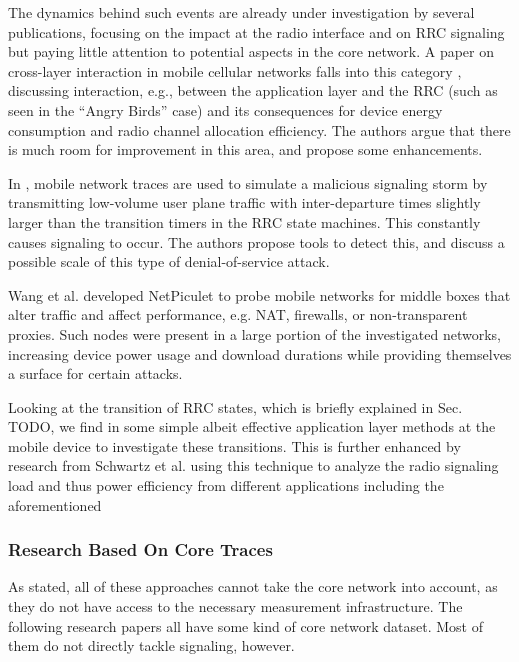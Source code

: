 The dynamics behind such events are already under investigation by several publications, focusing on the impact at the radio interface and on \ac{RRC} signaling but paying little attention to potential aspects in the core network. A paper on cross-layer interaction in mobile cellular networks falls into this category \cite{qian2011profiling}, discussing interaction, e.g., between the application layer and the \ac{RRC} (such as seen in the ``Angry Birds'' case) and its consequences for device energy consumption and radio channel allocation efficiency. The authors argue that there is much room for improvement in this area, and propose some enhancements.


In \cite{lee2007detection}, mobile network traces are used to simulate a malicious signaling storm by transmitting low-volume user plane traffic with inter-departure times slightly larger than the transition timers in the \ac{RRC} state machines. This constantly causes signaling to occur. The authors propose tools to detect this, and discuss a possible scale of this type of denial-of-service attack.

 
Wang et al.\cite{wang2011untold} developed NetPiculet to probe mobile networks for middle boxes that alter traffic and affect performance, e.g. NAT, firewalls, or non-transparent proxies. Such nodes were present in a large portion of the investigated networks, increasing device power usage and download durations while providing themselves a surface for certain attacks.

Looking at the transition of \ac{RRC} states, which is briefly explained in Sec. TODO, we find in \cite{5360763} some simple albeit effective application layer methods at the mobile device to investigate these transitions. This is further enhanced by research from Schwartz et al.\cite{schwartz2013angrybirds} using this technique to analyze the radio signaling load and thus power efficiency from different applications including the aforementioned


\subsubsection{Research Based On Core Traces}

As stated, all of these approaches cannot take the core network into account, as they do not have access to the necessary measurement infrastructure. The following research papers all have some kind of core network dataset. Most of them do not directly tackle signaling, however.

